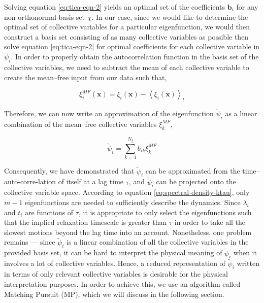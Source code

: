 \begin{spacing}{2.0}
    Solving equation \ref{eq:tica-eqn-2} yields an optimal set of the coefficients $\mathbf{b}_{i}$ for any non-orthonormal basis set $\chi$.
    In our case, since we would like to determine the optimal set of collective variables for a particular eigenfunction, we would then construct a 
    basis set consisting of as many collective variables as possible then solve equation \ref{eq:tica-eqn-2} for optimal coefficients for each
    collective variable in $\tilde{\psi}_i$. In order to properly obtain the autocorrelation function in the basis set of the collective variables, 
    we need to subtract the mean of each collective variable to create the mean--free input from our data such that,

    \begin{equation}
        \xi_i^{MF}(\mathbf{x}) = \xi_i(\mathbf{x}) - \left<\xi_i(\mathbf{x})\right>_t
    \end{equation}

    Therefore, we can now write an approximation of the eigenfunction $\tilde{\psi}_i$ as a linear combination of the mean--free collective 
    variables $\xi_k^{MF}$,

    \begin{equation}
        \tilde{\psi}_i = \sum_{k=1}^{N_{\xi}} b_{ik}\xi_k^{MF}
        \label{eq:linear-combination-cv}
    \end{equation}

    Consequently, we have demonstrated that $\tilde{\psi}_i$ can be approximated from the time--auto-corre-lation of itself at a lag time $\tau$,
    and $\tilde{\psi}_i$ can be projected onto the collective variable space. According to equation \ref{eq:spectral-density-ktau}, only $m-1$
    eigenfunctions are needed to sufficiently describe the dynamics. Since $\lambda_i$ and $t_i$ are functions of $\tau$, it is appropriate to only
    select the eigenfunctions such that the implied relaxation timescale is greater than $\tau$ in order to take all the slowest motions beyond
    the lag time into an account. Nonetheless, one problem remains --- since $\tilde{\psi}_i$ is a linear combination of all the collective variables
    in the provided basis set, it can be hard to interpret the physical meaning of $\tilde{\psi}_i$ when it involves a lot of collective variables.
    Hence, a reduced representation of $\tilde{\psi}_i$ written in terms of only relevant collective variables is desirable for the physical 
    interpretation purposes. In order to achieve this, we use an algorithm called Matching Pursuit (MP), which we will discuss in the following section.
\end{spacing}
